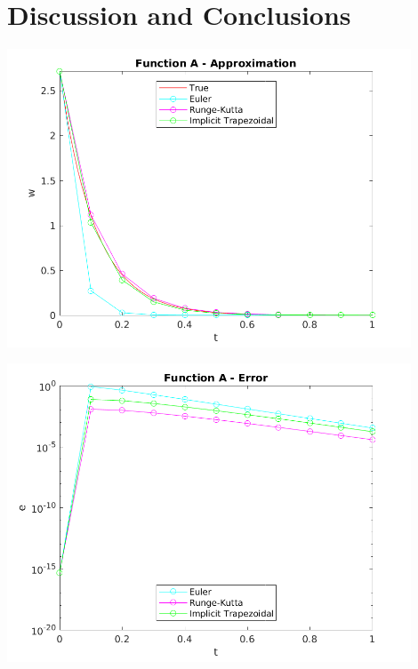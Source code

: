 \documentclass{article}
\begin{document}
\section{Discussion and Conclusions}
\label{sec:conc}

\begin{center}
  \includegraphics[width=0.9\textwidth]{../output/a_compare_val.png}
  \label{fig:a_compare_val}
\end{center}

\begin{center}
  \includegraphics[width=0.9\textwidth]{../output/a_compare_err.png}
  \label{fig:a_compare_err}
\end{center}
\end{document}
